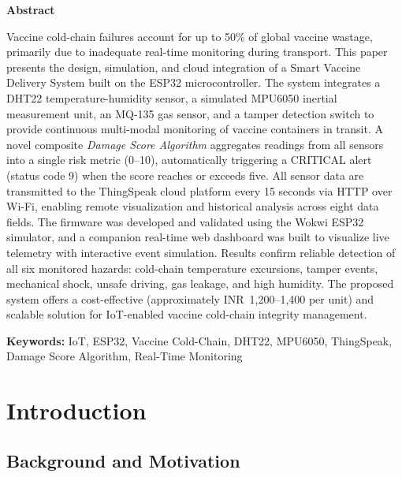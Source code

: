 \documentclass[12pt, a4paper]{article}
\begin{document}
\begin{center}
    \Large\textbf{Abstract}
\end{center}
\vspace{0.5cm}

\noindent
Vaccine cold-chain failures account for up to 50\% of global vaccine wastage, primarily due to inadequate real-time monitoring during transport. This paper presents the design, simulation, and cloud integration of a Smart Vaccine Delivery System built on the ESP32 microcontroller. The system integrates a DHT22 temperature-humidity sensor, a simulated MPU6050 inertial measurement unit, an MQ-135 gas sensor, and a tamper detection switch to provide continuous multi-modal monitoring of vaccine containers in transit. A novel composite \textit{Damage Score Algorithm} aggregates readings from all sensors into a single risk metric (0--10), automatically triggering a CRITICAL alert (status code 9) when the score reaches or exceeds five. All sensor data are transmitted to the ThingSpeak cloud platform every 15 seconds via HTTP over Wi-Fi, enabling remote visualization and historical analysis across eight data fields. The firmware was developed and validated using the Wokwi ESP32 simulator, and a companion real-time web dashboard was built to visualize live telemetry with interactive event simulation. Results confirm reliable detection of all six monitored hazards: cold-chain temperature excursions, tamper events, mechanical shock, unsafe driving, gas leakage, and high humidity. The proposed system offers a cost-effective (approximately INR~1,200--1,400 per unit) and scalable solution for IoT-enabled vaccine cold-chain integrity management.

\vspace{0.6cm}
\noindent\textbf{Keywords:} IoT, ESP32, Vaccine Cold-Chain, DHT22, MPU6050, ThingSpeak, Damage Score Algorithm, Real-Time Monitoring

\newpage

\section{Introduction}

\subsection{Background and Motivation}
\end{document}
